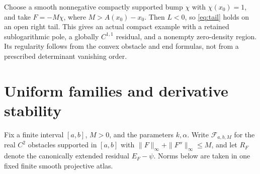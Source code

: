 \documentclass[11pt]{article}
\theoremstyle{remark}\newtheorem{remark}[theorem]{Remark}
\begin{document}
Choose a smooth nonnegative compactly supported bump $\chi$ with
$\chi(x_0)=1$, and take $F=-M\chi$, where $M>A(x_0)-x_0$.
Then $L<0$, so \eqref{eq:tail} holds on an open right tail.
This gives an actual compact example with a retained sublogarithmic
pole, a globally $C^{1,1}$ residual, and a nonempty zero-density region.
Its regularity follows from the convex obstacle and end formulas,
not from a prescribed determinant vanishing order.

\section{Uniform families and derivative stability}
Fix a finite interval $[a,b]$, $M>0$, and the parameters $k,\alpha$.
Write $\mathcal F_{a,b,M}$ for the real $C^2$ obstacles supported in
$[a,b]$ with $\|F\|_\infty+\|F''\|_\infty\le M$, and let
$R_F$ denote the canonically extended residual $E_F-\psi$.
Norms below are taken in one fixed finite smooth projective atlas.
\end{document}
